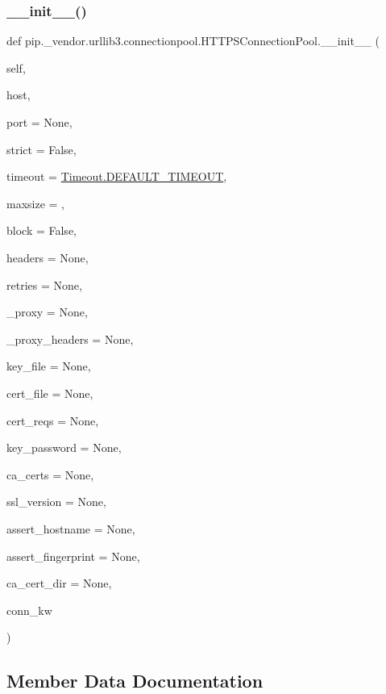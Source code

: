 \subsubsection{\texorpdfstring{\+\_\+\+\_\+init\+\_\+\+\_\+()}{\_\_init\_\_()}}
{\footnotesize\ttfamily def pip.\+\_\+vendor.\+urllib3.\+connectionpool.\+H\+T\+T\+P\+S\+Connection\+Pool.\+\_\+\+\_\+init\+\_\+\+\_\+ (\begin{DoxyParamCaption}\item[{}]{self,  }\item[{}]{host,  }\item[{}]{port = {\ttfamily None},  }\item[{}]{strict = {\ttfamily False},  }\item[{}]{timeout = {\ttfamily \hyperlink{classpip_1_1__vendor_1_1urllib3_1_1util_1_1timeout_1_1Timeout_ab2e2090779413149cdac51e5b0908e12}{Timeout.\+D\+E\+F\+A\+U\+L\+T\+\_\+\+T\+I\+M\+E\+O\+UT}},  }\item[{}]{maxsize = {},  }\item[{}]{block = {\ttfamily False},  }\item[{}]{headers = {\ttfamily None},  }\item[{}]{retries = {\ttfamily None},  }\item[{}]{\+\_\+proxy = {\ttfamily None},  }\item[{}]{\+\_\+proxy\+\_\+headers = {\ttfamily None},  }\item[{}]{key\+\_\+file = {\ttfamily None},  }\item[{}]{cert\+\_\+file = {\ttfamily None},  }\item[{}]{cert\+\_\+reqs = {\ttfamily None},  }\item[{}]{key\+\_\+password = {\ttfamily None},  }\item[{}]{ca\+\_\+certs = {\ttfamily None},  }\item[{}]{ssl\+\_\+version = {\ttfamily None},  }\item[{}]{assert\+\_\+hostname = {\ttfamily None},  }\item[{}]{assert\+\_\+fingerprint = {\ttfamily None},  }\item[{}]{ca\+\_\+cert\+\_\+dir = {\ttfamily None},  }\item[{}]{conn\+\_\+kw }\end{DoxyParamCaption})}



\subsection{Member Data Documentation}
\mbox{\label{classpip_1_1__vendor_1_1urllib3_1_1connectionpool_1_1HTTPSConnectionPool_ad4184ff7389e69ccb0b0040553ccec92}} 
